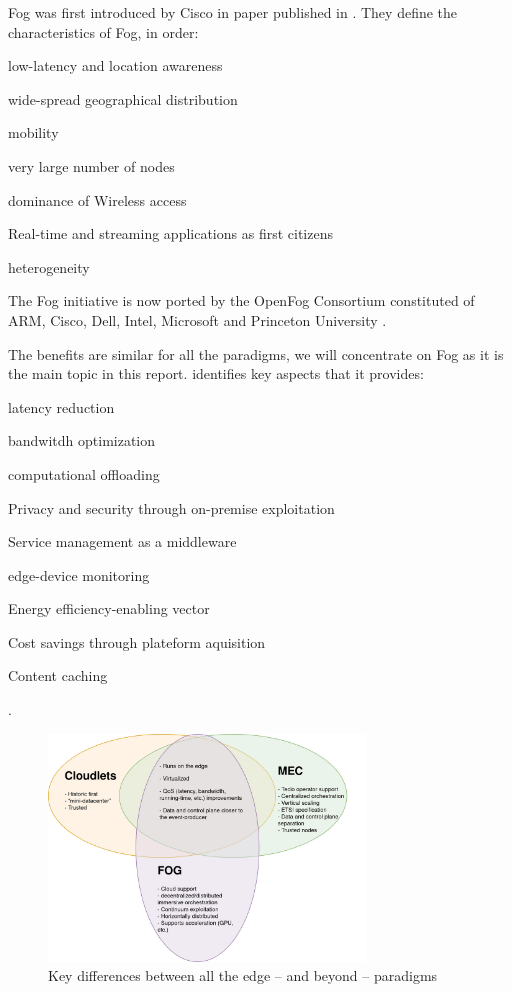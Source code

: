 \documentclass[11pt]{sdm}
\begin{document}
\begin{description}
	Fog was first introduced by Cisco in  paper published in . They define the characteristics of Fog, in order:
	\begin{enumerate*}[(i)]
		\item low-latency and location awareness
		\item wide-spread geographical distribution
		\item mobility
		\item very large number of nodes
		\item dominance of Wireless access
		\item Real-time and streaming applications as first citizens
		\item heterogeneity
	\end{enumerate*}
	The Fog initiative is now ported by the OpenFog Consortium  \cite{ieee_standards_association_ieee_2018} constituted of ARM, Cisco, Dell, Intel, Microsoft and Princeton University \cite{chiang_fog_2016}.
\end{description}

The benefits are similar for all the paradigms, we will concentrate on Fog as it is the main topic in this report. \citet{ahmed_fog_2019} identifies key aspects that it provides:
\begin{enumerate*}[(a)]
	\item latency reduction
	\item bandwitdh optimization
	\item computational offloading
	\item Privacy and security through on-premise exploitation
	\item Service management as a middleware
	\item edge-device monitoring
	\item Energy efficiency-enabling vector
	\item Cost savings through plateform aquisition
	\item Content caching
\end{enumerate*}.


\begin{figure}[t]
	\centering
	\includegraphics[width=0.75\textwidth]{./assets/CloudLetsVMECvFog.drawio.png}
	\caption{Key differences between all the edge -- and beyond -- paradigms}
	\label{fig:fogVall}
\end{figure}
\end{document}
